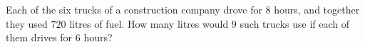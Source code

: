 Each of the six trucks of a construction company drove for $8$ hours, and together they used $720$ litres of fuel. How many litres would $9$ such trucks use if each of them drives for $6$ hours?
